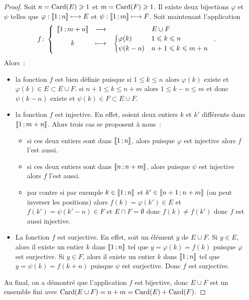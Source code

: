 \begin{proof}
  Soit \(n=\operatorname{Card}(E)\geqslant 1\) et \(m=\operatorname{Card}(F)\geqslant 1\). Il existe deux bijections \(\varphi\) et \(\psi\) telles que \(\varphi:\mathopen{\llbracket}1\mathclose{}\mathpunct{};n\mathclose{\rrbracket} \longmapsto E\) et \(\psi:\mathopen{\llbracket}1\mathclose{}\mathpunct{};m\mathclose{\rrbracket} \longmapsto F\). Soit maintenant l'application
  \begin{equation}
    f\colon \left\{\begin{array}{ccc} \mathopen{\llbracket}1\mathclose{}\mathpunct{};m+n\mathclose{\rrbracket} & \longrightarrow &E\cup F\\ k & \longmapsto & \begin{cases} \varphi(k) & 1\leqslant k\leqslant n \\ \psi(k-n) & n+1\leqslant k\leqslant m+n\end{cases} \end{array} \right..
  \end{equation}
  Alors~:
    \begin{itemize}
    \item la fonction \(f\) est bien définie puisque si \(1\leqslant k \leqslant n\) alors \(\varphi(k)\) existe et \(\varphi(k)\in E\subset E\cup F\). si \(n+1\leqslant k \leqslant n+m\) alors \(1\leqslant k-n \leqslant m\) et donc \(\psi(k-n)\) existe et \(\psi(k)\in F\subset E\cup F\).
    \item la fonction \(f\) est injective. En effet, soient deux entiers \(k\) et \(k'\) différents  dans \(\mathopen{\llbracket}1\mathclose{}\mathpunct{};m+n\mathclose{\rrbracket}\). Alors trois cas se proposent à nous~:
      \begin{itemize}
      \item si ces deux entiers sont dans \(\mathopen{\llbracket}1\mathclose{}\mathpunct{};n\mathclose{\rrbracket}\), alors puisque \(\varphi\) est injective alors \(f\) l'est aussi.
      \item si ces deux entiers sont dans \(\mathopen{\llbracket}n\mathclose{}\mathpunct{};n+m\mathclose{\rrbracket}\), alors puisque \(\psi\) est injective alors \(f\) l'est aussi.
      \item par contre si par exemple \(k\in\mathopen{\llbracket}1\mathclose{}\mathpunct{};n\mathclose{\rrbracket}\) et \(k'\in\mathopen{\llbracket}n+1\mathclose{}\mathpunct{};n+m\mathclose{\rrbracket}\) (on peut inverser les positions) alors \(f(k)=\varphi(k')\in E\) et \(f(k')=\psi(k'-n)\in F\) et \(E\cap F = \emptyset\) donc \(f(k)\neq f(k')\) donc \(f\) est aussi injective.
      \end{itemize}
    \item La fonction \(f\) est surjective. En effet, soit un élément \(y\) de \(E\cup F\). Si \(y\in E\), alors il existe un entier \(k\) dans \(\mathopen{\llbracket}1\mathclose{}\mathpunct{};n\mathclose{\rrbracket}\) tel que \(y=\varphi(k)=f(k)\) puisque \(\varphi\) est surjective. Si \(y\in F\), alors il existe un entier \(k\) dans \(\mathopen{\llbracket}1\mathclose{}\mathpunct{};n\mathclose{\rrbracket}\) tel que \(y=\psi(k)=f(k+n)\) puisque \(\psi\) est surjective. Donc \(f\) est surjective.
    \end{itemize}
    Au final, on a démontré que l'application \(f\) est bijective, donc \(E\cup F\) est un ensemble fini avec \(\operatorname{Card}(E\cup F)=n+m=\operatorname{Card}(E)+\operatorname{Card}(F)\).
  \end{proof}
